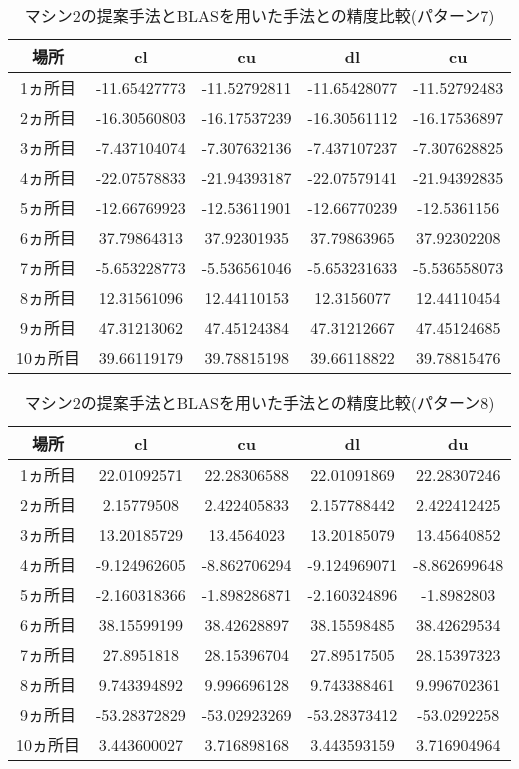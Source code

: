 \documentclass[11pt,a4paper]{jsreport}
\theoremstyle{definition}
\begin{document}
\begin{table}[H]
\centering
\begin{tabular}{|c|c|c|c|c|}
\hline
場所 & cl & cu & dl & cu \\ \hline
1ヵ所目 & -11.65427773 & -11.52792811 & -11.65428077 & -11.52792483 \\ \hline
2ヵ所目 & -16.30560803 & -16.17537239 & -16.30561112 & -16.17536897 \\ \hline
3ヵ所目 & -7.437104074 & -7.307632136 & -7.437107237 & -7.307628825 \\ \hline
4ヵ所目 & -22.07578833 & -21.94393187 & -22.07579141 & -21.94392835 \\ \hline
5ヵ所目 & -12.66769923 & -12.53611901 & -12.66770239 & -12.5361156 \\ \hline
6ヵ所目 & 37.79864313 & 37.92301935 & 37.79863965 & 37.92302208 \\ \hline
7ヵ所目 & -5.653228773 & -5.536561046 & -5.653231633 & -5.536558073 \\ \hline
8ヵ所目 & 12.31561096 & 12.44110153 & 12.3156077 & 12.44110454 \\ \hline
9ヵ所目 & 47.31213062 & 47.45124384 & 47.31212667 & 47.45124685 \\ \hline
10ヵ所目 & 39.66119179 & 39.78815198 & 39.66118822 & 39.78815476 \\ \hline
\end{tabular}
\caption{マシン2の提案手法とBLASを用いた手法との精度比較(パターン7)}
\end{table}

\begin{table}[H]
\centering
\begin{tabular}{|c|c|c|c|c|}
\hline
場所 & cl & cu & dl & du \\ \hline
1ヵ所目 & 22.01092571 & 22.28306588 & 22.01091869 & 22.28307246 \\ \hline
2ヵ所目 & 2.15779508 & 2.422405833 & 2.157788442 & 2.422412425 \\ \hline
3ヵ所目 & 13.20185729 & 13.4564023 & 13.20185079 & 13.45640852 \\ \hline
4ヵ所目 & -9.124962605 & -8.862706294 & -9.124969071 & -8.862699648 \\ \hline
5ヵ所目 & -2.160318366 & -1.898286871 & -2.160324896 & -1.8982803 \\ \hline
6ヵ所目 & 38.15599199 & 38.42628897 & 38.15598485 & 38.42629534 \\ \hline
7ヵ所目 & 27.8951818 & 28.15396704 & 27.89517505 & 28.15397323 \\ \hline
8ヵ所目 & 9.743394892 & 9.996696128 & 9.743388461 & 9.996702361 \\ \hline
9ヵ所目 & -53.28372829 & -53.02923269 & -53.28373412 & -53.0292258 \\ \hline
10ヵ所目 & 3.443600027 & 3.716898168 & 3.443593159 & 3.716904964 \\ \hline
\end{tabular}
\caption{マシン2の提案手法とBLASを用いた手法との精度比較(パターン8)}
\end{table}
\end{document}
